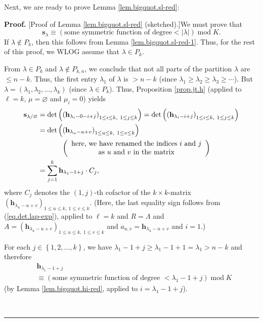 \documentclass[numbers=enddot,12pt,final,onecolumn,notitlepage]{scrartcl}%
\theoremstyle{definition}
\newenvironment{proof}[1][Proof]{\noindent\textbf{#1.} }{\ \rule{0.5em}{0.5em}}
\let\sumnonlimits\sum
\renewcommand{\sum}{\sumnonlimits\limits}
\begin{document}
Next, we are ready to prove Lemma \ref{lem.bigquot.sl-red}:

\begin{proof}
[Proof of Lemma \ref{lem.bigquot.sl-red} (sketched).]We must prove that
\[
\mathbf{s}_{\lambda}\equiv\left(  \text{some symmetric function of degree
}<\left\vert \lambda\right\vert \right)  \operatorname{mod}K.
\]
If $\lambda\notin P_{k}$, then this follows from Lemma
\ref{lem.bigquot.sl-red-1}. Thus, for the rest of this proof, we WLOG assume
that $\lambda\in P_{k}$.

From $\lambda\in P_{k}$ and $\lambda\notin P_{k,n}$, we conclude that not all
parts of the partition $\lambda$ are $\leq n-k$. Thus, the first entry
$\lambda_{1}$ of $\lambda$ is $>n-k$ (since $\lambda_{1}\geq\lambda_{2}%
\geq\lambda_{3}\geq\cdots$). But $\lambda=\left(  \lambda_{1},\lambda
_{2},\ldots,\lambda_{k}\right)  $ (since $\lambda\in P_{k}$). Thus,
Proposition \ref{prop.jt.h} (applied to $\ell=k$, $\mu=\varnothing$ and
$\mu_{i}=0$) yields%
\begin{align}
\mathbf{s}_{\lambda/\varnothing}  &  =\det\left(  \left(  \mathbf{h}%
_{\lambda_{i}-0-i+j}\right)  _{1\leq i\leq k,\ 1\leq j\leq k}\right)
=\det\left(  \left(  \mathbf{h}_{\lambda_{i}-i+j}\right)  _{1\leq i\leq
k,\ 1\leq j\leq k}\right) \nonumber\\
&  =\det\left(  \left(  \mathbf{h}_{\lambda_{u}-u+v}\right)  _{1\leq u\leq
k,\ 1\leq v\leq k}\right) \nonumber\\
&  \ \ \ \ \ \ \ \ \ \ \left(
\begin{array}
[c]{c}%
\text{here, we have renamed the indices }i\text{ and }j\\
\text{as }u\text{ and }v\text{ in the matrix}%
\end{array}
\right) \nonumber\\
&  =\sum_{j=1}^{k}\mathbf{h}_{\lambda_{1}-1+j}\cdot C_{j},
\label{pf.lem.bigquot.sl-red.JT}%
\end{align}
where $C_{j}$ denotes the $\left(  1,j\right)  $-th cofactor of the $k\times
k$-matrix $\left(  \mathbf{h}_{\lambda_{u}-u+v}\right)  _{1\leq u\leq
k,\ 1\leq v\leq k}$. (Here, the last equality sign follows from
(\ref{eq.det.lap-exp}), applied to $\ell=k$ and $R=\Lambda$ and $A=\left(
\mathbf{h}_{\lambda_{u}-u+v}\right)  _{1\leq u\leq k,\ 1\leq v\leq k}$ and
$a_{u,v}=\mathbf{h}_{\lambda_{u}-u+v}$ and $i=1$.)

For each $j\in\left\{  1,2,\ldots,k\right\}  $, we have $\lambda_{1}%
-1+j\geq\lambda_{1}-1+1=\lambda_{1}>n-k$ and therefore%
\begin{align}
&  \mathbf{h}_{\lambda_{1}-1+j}\nonumber\\
&  \equiv\left(  \text{some symmetric function of degree }<\lambda
_{1}-1+j\right)  \operatorname{mod}K \label{pf.lem.bigquot.sl-red.deg2}%
\end{align}
(by Lemma \ref{lem.bigquot.hi-red}, applied to $i=\lambda_{1}-1+j$).


\end{proof}
\end{document}
